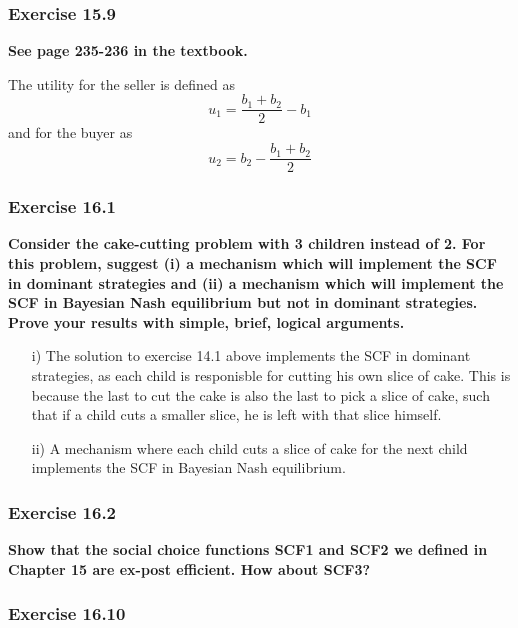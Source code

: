 \documentclass[12pt, a4paper]{article}
\begin{document}
\subsubsection*{Exercise 15.9}

\textbf{See page 235-236 in the textbook.}

The utility for the seller is defined as
\[ u_1 = \frac{b_1 + b_2}{2} - b_1 \]
and for the buyer as
\[ u_2 = b_2 - \frac{b_1 + b_2}{2} \]



\subsubsection*{Exercise 16.1}

\textbf{Consider the cake-cutting problem with 3 children instead of 2. For this problem, suggest (i) a mechanism which will implement the SCF in dominant strategies and (ii) a mechanism which will implement the SCF in Bayesian Nash equilibrium but not in dominant strategies. Prove your results with simple, brief, logical arguments.}

\begin{enumerate}
	\item[i)] The solution to exercise 14.1 above implements the SCF in dominant strategies, as each child is responisble for cutting his own slice of cake. This is because the last to cut the cake is also the last to pick a slice of cake, such that if a child cuts a smaller slice, he is left with that slice himself.
	\item[ii)] A mechanism where each child cuts a slice of cake for the next child implements the SCF in Bayesian Nash equilibrium.
\end{enumerate}

\subsubsection*{Exercise 16.2}

\textbf{Show that the social choice functions SCF1 and SCF2 we defined in Chapter 15 are ex-post efficient. How about SCF3?}

\subsubsection*{Exercise 16.10}
\end{document}
